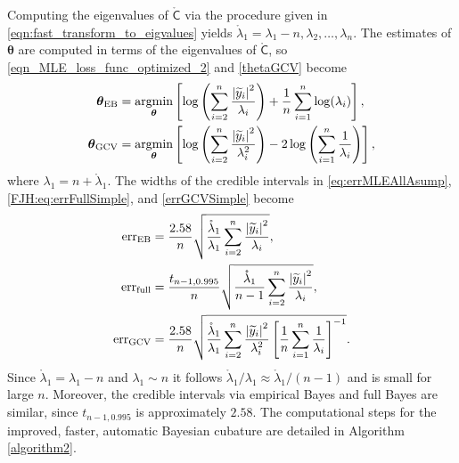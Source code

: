 \documentclass[twocolumn]{svjour3}          %
\newcommand{\bm}[1]{\boldsymbol{#1}}
\newcommand{\rlambda}{\mathring{\lambda}}
\newcommand{\vtheta}{{\bm{\theta}}}
\newcommand{\rmC}{\mathring{\mathsf{C}}}
\newcommand{\MLE}{\textup{EB}}
\newcommand{\GCV}{\textup{GCV}}
\newcommand{\err}{\textup{err}}
\def\abs#1{\ensuremath{\left \lvert #1 \right \rvert}}
\providecommand{\argmin}{\operatorname*{argmin}}
\begin{document}
Computing the eigenvalues of $\rmC$ via the procedure given in \eqref{eqn:fast_transform_to_eigvalues} yields $\rlambda_1 = \lambda_1 - n, \lambda_2, \ldots, \lambda_n$. The estimates of $\vtheta$ are computed in terms of the eigenvalues of $\rmC$, so \eqref{eqn_MLE_loss_func_optimized_2} and \eqref{thetaGCV} become
\begin{subequations}
\label{thetaSimple}
\begin{align}
\label{thetaSimpleMLE}
\vtheta_\MLE
&= 
\argmin_{\vtheta}
\left[
\log\left(
\sum_{i=2}^n \frac{\abs{\widetilde{y}_i}^2}{\lambda_i}
\right) 
 + 
 \frac{1}{n}\sum_{i=1}^n \log(\lambda_i)
\right], \\
\label{thetaSimpleGCV}
\vtheta_{\GCV} 
&= \argmin_\vtheta \left[ \log \left ( \sum_{i=2}^n \frac{\abs{\widetilde{y}_i}^2}{\lambda_i^2} 
\right)  -2\log\left( \sum_{i=1}^n \frac{1}{\lambda_i} \right)
\right],
\end{align}
\end{subequations}
where $\lambda_1 = n + \rlambda_1$.  The widths of the credible intervals in \eqref{eq:errMLEAllAsump}, \eqref{FJH:eq:errFullSimple}, and   \eqref{errGCVSimple} become
\begin{subequations}
\label{fastStoppingCriterions}
	\begin{align}
\label{fastStoppingCriterionMLE}
\err_\MLE  &
=
\frac{2.58}{n}\sqrt{
	\frac{\rlambda_1}{\lambda_1}
	\sum_{i=2}^{n} \frac{\abs{\widetilde{y}_i}^2}{\lambda_i}  
}, 
\\
\label{fastStoppingCriterionFull}
\err_{\textup{full}} 
& = \frac{t_{n-1,0.995}}{n} \sqrt{
	\frac{\rlambda_1}{n-1} \sum_{i=2}^n \frac{\abs{\widetilde{y}_i}^2}{\lambda_i}
}, \\
\label{fastStoppingCriterionGCV}
\err_{\textup{GCV}} & =
\frac{2.58}{n}\sqrt{	\frac{\rlambda_1}{\lambda_1} \sum_{i=2}^n \frac{\abs{\widetilde{y}_i}^2}{\lambda_i^2}  \left [ \frac 1n \sum_{i=1}^n \frac{1}{\lambda_i} \right]^{-1}} .
	\end{align}
\end{subequations}
Since $\rlambda_1 = \lambda_1 - n$ and $\lambda_1 \sim n$ it follows $\rlambda_1/\lambda_1 \approx \rlambda_1/(n-1)$ and is small for  large $n$.  Moreover, the credible intervals via empirical Bayes and full Bayes are similar, since $t_{n-1,0.995}$ is approximately $2.58$. 
The computational steps for the improved, faster, automatic Bayesian cubature are detailed in Algorithm \ref{algorithm2}.
\end{document}
